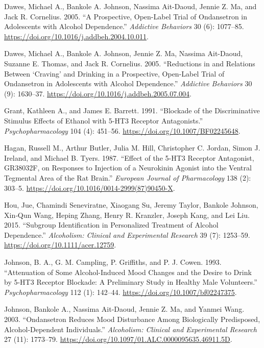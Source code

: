 \documentclass[
  12pt,
]{article}
\newlength{\cslhangindent}
\newenvironment{CSLReferences}[2] %
 {\begin{list}{}{%
  \setlength{\itemindent}{0pt}
  \setlength{\leftmargin}{0pt}
  \setlength{\parsep}{0pt}
  \ifodd #1
   \setlength{\leftmargin}{\cslhangindent}
   \setlength{\itemindent}{-1\cslhangindent}
  \fi
  \setlength{\itemsep}{#2\baselineskip}}}
 {\end{list}}
\begin{document}
\begin{CSLReferences}{1}{0}
Dawes, Michael A., Bankole A. Johnson, Nassima Ait-Daoud, Jennie Z. Ma,
and Jack R. Cornelius. 2005. {``A Prospective, Open-Label Trial of
Ondansetron in Adolescents with Alcohol Dependence.''} \emph{Addictive
Behaviors} 30 (6): 1077--85.
\url{https://doi.org/10.1016/j.addbeh.2004.10.011}.

Dawes, Michael A., Bankole A. Johnson, Jennie Z. Ma, Nassima Ait-Daoud,
Suzanne E. Thomas, and Jack R. Cornelius. 2005. {``Reductions in and
Relations Between {`Craving'} and Drinking in a Prospective, Open-Label
Trial of Ondansetron in Adolescents with Alcohol Dependence.''}
\emph{Addictive Behaviors} 30 (9): 1630--37.
\url{https://doi.org/10.1016/j.addbeh.2005.07.004}.

Grant, Kathleen A., and James E. Barrett. 1991. {``Blockade of the
Discriminative Stimulus Effects of Ethanol with 5-{HT3} Receptor
Antagonists.''} \emph{Psychopharmacology} 104 (4): 451--56.
\url{https://doi.org/10.1007/BF02245648}.

Hagan, Russell M., Arthur Butler, Julia M. Hill, Christopher C. Jordan,
Simon J. Ireland, and Michael B. Tyers. 1987. {``Effect of the 5-{HT3}
Receptor Antagonist, {GR38032F}, on Responses to Injection of a
Neurokinin Agonist into the Ventral Tegmental Area of the Rat Brain.''}
\emph{European Journal of Pharmacology} 138 (2): 303--5.
\url{https://doi.org/10.1016/0014-2999(87)90450-X}.

Hou, Jue, Chamindi Seneviratne, Xiaogang Su, Jeremy Taylor, Bankole
Johnson, Xin‐Qun Wang, Heping Zhang, Henry R. Kranzler, Joseph Kang, and
Lei Liu. 2015. {``Subgroup {Identification} in {Personalized Treatment}
of {Alcohol Dependence}.''} \emph{Alcoholism: Clinical and Experimental
Research} 39 (7): 1253--59. \url{https://doi.org/10.1111/acer.12759}.

Johnson, B. A., G. M. Campling, P. Griffiths, and P. J. Cowen. 1993.
{``Attenuation of Some Alcohol-Induced Mood Changes and the Desire to
Drink by 5-{HT3} Receptor Blockade: A Preliminary Study in Healthy Male
Volunteers.''} \emph{Psychopharmacology} 112 (1): 142--44.
\url{https://doi.org/10.1007/bf02247375}.

Johnson, Bankole A., Nassima Ait‐Daoud, Jennie Z. Ma, and Yanmei Wang.
2003. {``Ondansetron {Reduces Mood Disturbance Among Biologically
Predisposed}, {Alcohol}‐{Dependent Individuals}.''} \emph{Alcoholism:
Clinical and Experimental Research} 27 (11): 1773--79.
\url{https://doi.org/10.1097/01.ALC.0000095635.46911.5D}.


\end{CSLReferences}
\end{document}
